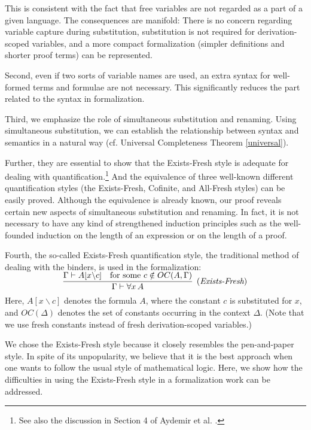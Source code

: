 \documentclass{svjour3}                     %
\newcommand{\seqr}[3]{\rbm{\infer{#2}{#1}}\;\;\text{$#3$}}
\newcommand{\Ga}{\Gamma}
\newcommand{\De}{\Delta}
\newcommand{\vd}{\vdash}
\newcommand{\bs}{\backslash}
\newcommand{\rbm}[1]{\raisebox{-1.5ex}[0.5ex]{$#1$}}
\begin{document}
This is consistent with the fact that free variables are not regarded as a part of a given language. The consequences are manifold: There is no concern regarding variable capture during substitution, substitution is not required for derivation-scoped variables, and a more compact formalization (simpler definitions and shorter proof terms) can be represented.

Second, even if two sorts of variable names are used, an extra syntax for well-formed terms and formulae are not necessary. This significantly reduces the part related to the syntax in formalization.

Third, we emphasize the role of simultaneous substitution and renaming.
Using simultaneous substitution, we can establish the relationship between syntax and semantics in a natural way (cf. Universal Completeness Theorem \ref{universal}).

Further, they are essential to show that the Exists-Fresh style is adequate for dealing with quantification.\footnote{See also the discussion in Section 4 of Aydemir et al. \cite{engineering}.} And the equivalence of three well-known different quantification styles (the Exists-Fresh, Cofinite, and All-Fresh styles) can be easily proved. Although the equivalence is already known, our proof reveals certain new aspects of simultaneous substitution and renaming. In fact, it is not necessary to have any kind of strengthened induction principles such as the well-founded induction on the length of an expression or on the length of a proof. 


Fourth, the so-called Exists-Fresh quantification style, the traditional method of dealing with the binders, is used in the formalization:
\[
\seqr{\Ga \vd A[x\bs c] & \text{for some }c \notin OC(A, \Ga)}{\Ga \vd \forall x\, A}{(\textit{Exists-Fresh})}
\]
Here, $A[x\bs c]$ denotes the formula $A$, where the constant $c$ is substituted for $x$, and $OC(\De)$ denotes the set of constants occurring in the context $\De$. (Note that we use fresh constants instead of fresh derivation-scoped variables.) 

We chose the Exists-Fresh style because it closely resembles the pen-and-paper style. In spite of its unpopularity, we believe that it is the best approach when one wants to follow the usual style of mathematical logic. Here, we show how the difficulties in using the Exists-Fresh style in a formalization work can be addressed.
\end{document}
